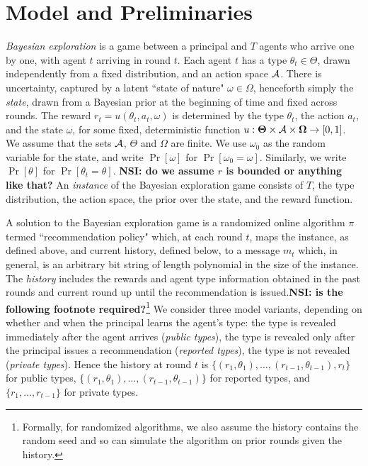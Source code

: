 \section{Model and Preliminaries}
\label{sec:model}


\emph{Bayesian exploration} is a game between a principal and $T$ agents who arrive one by one, with agent $t$ arriving in round $t$. Each agent $t$ has a type $\theta_t\in\varTheta$, drawn independently from a fixed distribution, and an action space $\mathcal{A}$.  There is uncertainty, captured by a latent ``state of nature" $\omega\in \varOmega$, henceforth simply the \emph{state}, drawn from a Bayesian prior at the beginning of time and fixed across rounds. The reward $r_t = u(\theta_t,a_t,\omega)$ is determined by the type $\theta_t$, the action $a_t$, and the state $\omega$, for some fixed, deterministic function
$u:\bold{\Theta}\times \mathcal{A} \times \bold{\Omega} \to [0,1]$.  We assume that the sets $\mathcal{A}$, $\varTheta$ and $\varOmega$ are finite. We use $\omega_0$ as the random variable for the state, and write $\Pr[\omega]$ for $\Pr[\omega_0=\omega]$. Similarly, we write $\Pr[\theta]$ for $\Pr[\theta_t=\theta]$. {\bf NSI: do we assume $r$ is bounded or anything like that?} An {\em instance} of the Bayesian exploration game consists of $T$, the type distribution, the action space, the prior over the state, and the reward function.

A solution to the Bayesian exploration game is a randomized online algorithm $\pi$ termed ``recommendation policy" which, at each round $t$, maps the instance, as defined above, and current history, defined below, to a message $m_t$ which, in general, is an arbitrary bit string of length polynomial in the size of the instance.  The {\em history} includes the rewards and agent type information obtained in the past rounds and current round up until the recommendation is issued.{\bf NSI: is the following footnote required?}\footnote{Formally, for randomized algorithms, we also assume the history contains the random seed and so can simulate the algorithm on prior rounds given the history.}  We consider three model variants, depending on whether and when the principal learns the agent's type: the type is revealed immediately after the agent arrives (\emph{public types}), the type is revealed only after the principal issues a recommendation (\emph{reported types}), the type is not revealed (\emph{private types}). Hence the history at round $t$ is $\{(r_1,\theta_1),\ldots,(r_{t-1},\theta_{t-1}),r_t\}$ for public types, $\{(r_1,\theta_1),\ldots,(r_{t-1},\theta_{t-1})\}$ for reported types, and $\{r_1,\ldots,r_{t-1}\}$ for private types.

